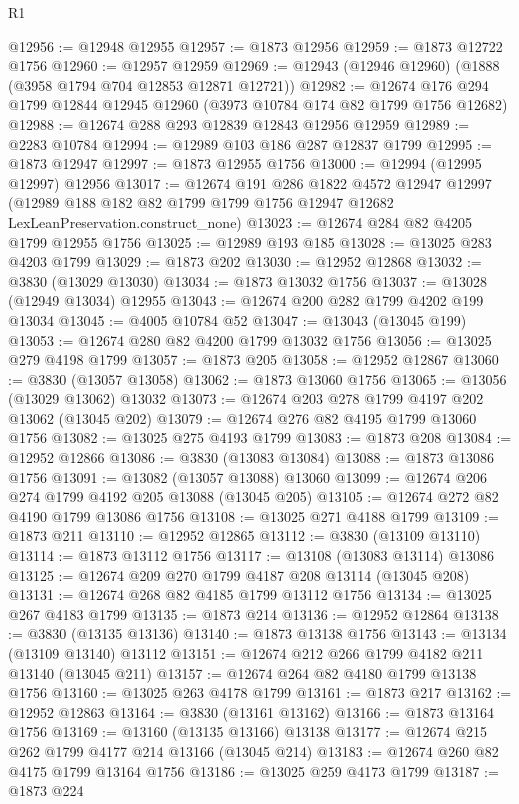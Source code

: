 \begin{lexlean}{R1}
\begin{coremodule}
@12956 := @12948 @12955
@12957 := @1873 @12956
@12959 := @1873 @12722 @1756
@12960 := @12957 @12959
@12969 := @12943 (@12946 @12960) (@1888 (@3958 @1794 @704 @12853 @12871 @12721))
@12982 := @12674 @176 @294 @1799 @12844 @12945 @12960 (@3973 @10784 @174 @82 @1799 @1756 @12682)
@12988 := @12674 @288 @293 @12839 @12843 @12956 @12959
@12989 := @2283 @10784
@12994 := @12989 @103 @186 @287 @12837 @1799
@12995 := @1873 @12947
@12997 := @1873 @12955 @1756
@13000 := @12994 (@12995 @12997) @12956
@13017 := @12674
    @191
    @286
    @1822
    @4572
    @12947
    @12997
    (@12989 @188 @182 @82 @1799 @1799 @1756 @12947 @12682 LexLeanPreservation.construct_none)
@13023 := @12674 @284 @82 @4205 @1799 @12955 @1756
@13025 := @12989 @193 @185
@13028 := @13025 @283 @4203 @1799
@13029 := @1873 @202
@13030 := @12952 @12868
@13032 := @3830 (@13029 @13030)
@13034 := @1873 @13032 @1756
@13037 := @13028 (@12949 @13034) @12955
@13043 := @12674 @200 @282 @1799 @4202 @199 @13034
@13045 := @4005 @10784 @52
@13047 := @13043 (@13045 @199)
@13053 := @12674 @280 @82 @4200 @1799 @13032 @1756
@13056 := @13025 @279 @4198 @1799
@13057 := @1873 @205
@13058 := @12952 @12867
@13060 := @3830 (@13057 @13058)
@13062 := @1873 @13060 @1756
@13065 := @13056 (@13029 @13062) @13032
@13073 := @12674 @203 @278 @1799 @4197 @202 @13062 (@13045 @202)
@13079 := @12674 @276 @82 @4195 @1799 @13060 @1756
@13082 := @13025 @275 @4193 @1799
@13083 := @1873 @208
@13084 := @12952 @12866
@13086 := @3830 (@13083 @13084)
@13088 := @1873 @13086 @1756
@13091 := @13082 (@13057 @13088) @13060
@13099 := @12674 @206 @274 @1799 @4192 @205 @13088 (@13045 @205)
@13105 := @12674 @272 @82 @4190 @1799 @13086 @1756
@13108 := @13025 @271 @4188 @1799
@13109 := @1873 @211
@13110 := @12952 @12865
@13112 := @3830 (@13109 @13110)
@13114 := @1873 @13112 @1756
@13117 := @13108 (@13083 @13114) @13086
@13125 := @12674 @209 @270 @1799 @4187 @208 @13114 (@13045 @208)
@13131 := @12674 @268 @82 @4185 @1799 @13112 @1756
@13134 := @13025 @267 @4183 @1799
@13135 := @1873 @214
@13136 := @12952 @12864
@13138 := @3830 (@13135 @13136)
@13140 := @1873 @13138 @1756
@13143 := @13134 (@13109 @13140) @13112
@13151 := @12674 @212 @266 @1799 @4182 @211 @13140 (@13045 @211)
@13157 := @12674 @264 @82 @4180 @1799 @13138 @1756
@13160 := @13025 @263 @4178 @1799
@13161 := @1873 @217
@13162 := @12952 @12863
@13164 := @3830 (@13161 @13162)
@13166 := @1873 @13164 @1756
@13169 := @13160 (@13135 @13166) @13138
@13177 := @12674 @215 @262 @1799 @4177 @214 @13166 (@13045 @214)
@13183 := @12674 @260 @82 @4175 @1799 @13164 @1756
@13186 := @13025 @259 @4173 @1799
@13187 := @1873 @224

\end{coremodule}
\end{lexlean}
